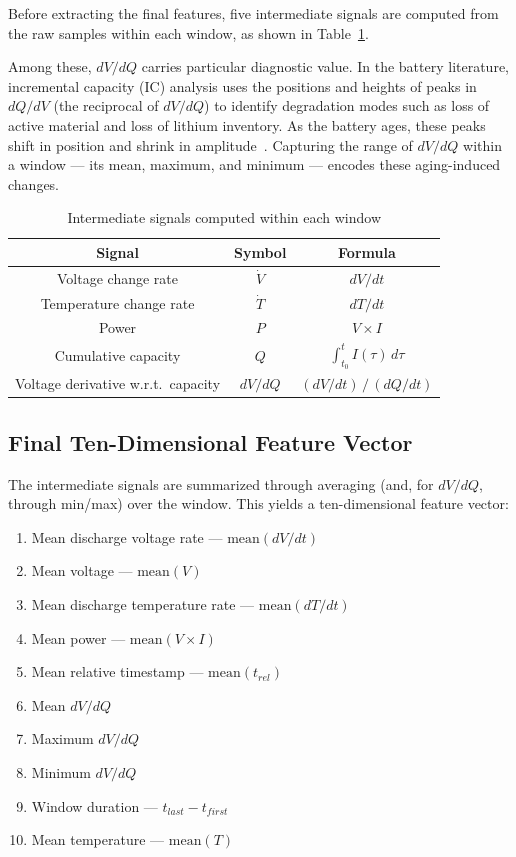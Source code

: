 Before extracting the final features, five intermediate signals are computed from the raw samples within each window, as shown in Table~\ref{tab:intermediate_signals}.

Among these, $dV/dQ$ carries particular diagnostic value. In the battery literature, incremental capacity (IC) analysis uses the positions and heights of peaks in $dQ/dV$ (the reciprocal of $dV/dQ$) to identify degradation modes such as loss of active material and loss of lithium inventory. As the battery ages, these peaks shift in position and shrink in amplitude~\autocite{dubarry2012}. Capturing the range of $dV/dQ$ within a window --- its mean, maximum, and minimum --- encodes these aging-induced changes.

\begin{table}[H]
    \centering
    \setcellgapes{3pt}
    \makegapedcells
    \begin{tabular}{c c c}
    \hline
    Signal & Symbol & Formula \\
    \hline
    Voltage change rate & $\dot{V}$ & $dV/dt$ \\
    Temperature change rate & $\dot{T}$ & $dT/dt$ \\
    Power & $P$ & $V \times I$ \\
    Cumulative capacity & $Q$ & $\int_{t_0}^{t} I(\tau)\, d\tau$ \\
    Voltage derivative w.r.t.\ capacity & $dV/dQ$ & $(dV/dt)\,/\,(dQ/dt)$ \\
    \hline
    \end{tabular}
    \caption{Intermediate signals computed within each window}
    \label{tab:intermediate_signals}
\end{table}

\subsection{Final Ten-Dimensional Feature Vector}

The intermediate signals are summarized through averaging (and, for $dV/dQ$, through min/max) over the window. This yields a ten-dimensional feature vector:

\begin{enumerate}
    \item Mean discharge voltage rate  ---  $\text{mean}(dV/dt)$
    \item Mean voltage  ---  $\text{mean}(V)$
    \item Mean discharge temperature rate  ---  $\text{mean}(dT/dt)$
    \item Mean power  ---  $\text{mean}(V \times I)$
    \item Mean relative timestamp  ---  $\text{mean}(t_{rel})$
    \item Mean $dV/dQ$
    \item Maximum $dV/dQ$
    \item Minimum $dV/dQ$
    \item Window duration  ---  $t_{last} - t_{first}$
    \item Mean temperature  ---  $\text{mean}(T)$
\end{enumerate}

